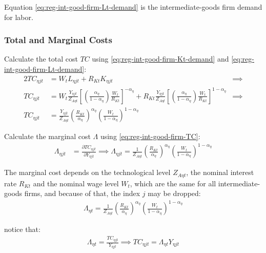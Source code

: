 \documentclass[
thesis.tex
]{subfiles}
\begin{document}
Equation \ref{eq:reg-int-good-firm-Lt-demand} is the intermediate-goods firm demand for labor.

\subsubsection*{Total and Marginal Costs}

Calculate the total cost $TC$ using \ref{eq:reg-int-good-firm-Kt-demand} and \ref{eq:reg-int-good-firm-Lt-demand}:
\begin{alignat}{2}
	TC_{\eta jt} & = W_t L_{\eta jt} + R_{Kt} K_{\eta jt} &\implies \nonumber \\
	TC_{\eta jt} & = W_t \frac{Y_{\eta jt}}{Z_{A\eta t}} \left[ \left( \frac{{\alpha_\eta}}{1-{\alpha_\eta}} \right) \frac{W_t}{R_{Kt}} \right]^{-{\alpha_\eta}} + R_{Kt} \frac{Y_{\eta jt}}{Z_{A\eta t}} \left[ \left( \frac{{\alpha_\eta}}{1-{\alpha_\eta}} \right) \frac{W_t}{R_{Kt}} \right]^{1-{\alpha_\eta}} &\implies \nonumber \\
	TC_{\eta jt} & = \frac{Y_{\eta jt}}{Z_{A\eta t}} \left( \frac{R_{Kt}}{{\alpha_\eta}} \right)^{{\alpha_\eta}} \left( \frac{W_t}{1-{\alpha_\eta}} \right)^{1-{\alpha_\eta}} \label{eq:reg-int-good-firm-TC}
\end{alignat}


Calculate the marginal cost $\Lambda$ using \ref{eq:reg-int-good-firm-TC}: 
\begin{align}
	\Lambda_{\eta jt} & = \frac{\partial TC_{\eta jt}}{\partial Y_{\eta jt}} \implies 
	\Lambda_{\eta jt} = \frac{1}{Z_{A\eta t}} \left( \frac{R_{Kt}}{{\alpha_\eta}} \right)^{{\alpha_\eta}} \left( \frac{W_t}{1-{\alpha_\eta}} \right)^{1-{\alpha_\eta}} \label{eq:reg-int-good-firm-MC}
\end{align}

The marginal cost depends on the technological level $Z_{A\eta t}$, the nominal interest rate $R_{Kt}$ and the nominal wage level $W_t$, which are the same for all intermediate-goods firms, and because of that, the index $j$ may be dropped:
\begin{align}
	\label{eq:reg-int-good-firm-MC-2}
	\Lambda_{\eta t} = \frac{1}{Z_{A\eta t}} \left( \frac{R_{Kt}}{{\alpha_\eta}} \right)^{{\alpha_\eta}} \left( \frac{W_t}{1-{\alpha_\eta}} \right)^{1-{\alpha_\eta}}
\end{align}

notice that:
\begin{align}
	\label{eq:reg-int-good-firm-TC-MC}
	\Lambda_{\eta t} = \frac{TC_{\eta jt}}{Y_{\eta jt}} \implies 
	TC_{\eta jt} = \Lambda_{\eta t} Y_{\eta jt}
\end{align}
\end{document}
